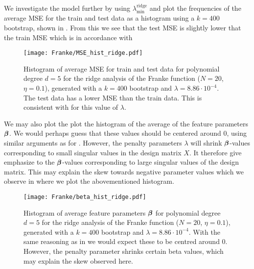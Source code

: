         We investigate the model further by using $\lambda^\mathrm{ridge}_\mathrm{min}$ and plot the frequencies of the average MSE for the train and test data as a histogram using a $k=400$ bootstrap, shown in . From this we see that the test MSE is slightly lower that the train MSE which is in accordance with 

        \begin{figure}
            \texttt{[image: Franke/MSE\_hist\_ridge.pdf]}
            \caption{Histogram of average MSE for train and test data for polynomial degree $d=5$ for the ridge analysis of the Franke function ($N=20$, $\eta=0.1$), generated with a $k=400$ bootstrap and $\lambda=8.86\cdot 10^{-4}$. The test data has a lower MSE than the train data. This is consistent with  for this value of $\lambda$.}
            \label{fig:mse_hist_ridge}
        \end{figure}

        We may also plot the plot the histogram of the average of the feature parameters $\boldsymbol{\beta}$. We would perhaps guess that these values should be centered around 0, using similar arguments as for . However, the penalty parameters $\lambda$ will shrink $\boldsymbol{\beta}$-values corresponding to small singular values in the design matrix $X$. It therefore give emphasize to the $\boldsymbol{\beta}$-values corresponding to large singular values of the design matrix. This may explain the skew towards negative parameter values which we observe in  where we plot the abovementioned histogram. 
        \begin{figure}
            \texttt{[image: Franke/beta\_hist\_ridge.pdf]} 
            \caption{Histogram of average feature parameters $\boldsymbol{\beta}$ for polynomial degree $d=5$ for the ridge analysis of the Franke function ($N=20$, $\eta=0.1$), generated with a $k=400$ bootstrap and $\lambda=8.86\cdot 10^{-4}$. With the same reasoning as in  we would expect these to be centred around 0. However, the penalty parameter shrinks certain beta values, which may explain the skew observed here.}
            \label{fig:beta_hist_ridge}
        \end{figure}











